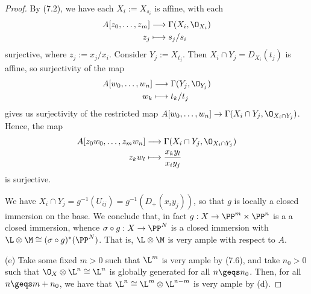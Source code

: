 \documentclass[12pt]{amsart}
\begin{document}
\begin{proof}
  By (7.2), we have each $X_i:=X_{s_i}$ is affine, with each
  \begin{align*}
    A[z_0,\ldots, z_m] 
    &\longrightarrow \Gamma(X_i,\O_{X_i}) \\
    z_j
    &\longmapsto s_j/s_i
  \end{align*}
  surjective, where $z_j:=x_j/x_i$.
  Consider $Y_j:= X_{t_j}$.%
  Then $X_i\cap Y_j= D_{X_i}(t_j)$ is affine, so surjectivity of the map
  \begin{align*}
    A[w_0,\ldots, w_n] 
    &\longrightarrow \Gamma(Y_j,\O_{Y_j}) \\
    w_k
    &\longmapsto t_k/t_j
  \end{align*}
  gives us surjectivity of the restricted map $A[w_0,\ldots,w_n]\to \Gamma(X_i\cap Y_j,\O_{X_i\cap Y_j})$.
  Hence, the map
  \begin{align*}
    A[z_0w_0,\ldots,z_mw_n]
    &\longrightarrow \Gamma(X_i\cap Y_j,\O_{X_i\cap Y_j}) \\
    z_kw_l&\longmapsto \frac{x_ky_l}{x_iy_j}
  \end{align*}
  is surjective.

  We have $X_i\cap Y_j= g^{-1}(U_{ij})=g^{-1}(D_+(x_iy_j))$, so that $g$ is locally a closed immersion on the base.
  We conclude that, in fact $g:X\to \PP^m\times \PP^n$ is a a closed immersion, whence $\sigma\circ g:X\to \PP^N$ is a closed immersion with $\L\otimes \M\cong (\sigma\circ g)^*(\PP^N)$.
  That is, $\L\otimes \M$ is very ample with respect to $A$.

  (e) Take some fixed $m>0$ such that $\L^m$ is very ample by (7.6), and take $n_0>0$ such that $\O_X\otimes \L^n\cong \L^n$ is globally generated for all $n\geqs n_0$.
  Then, for all $n\geqs m+n_0$, we have that $\L^n\cong \L^m\otimes \L^{n-m}$ is very ample by (d).
\end{proof}
\end{document}
